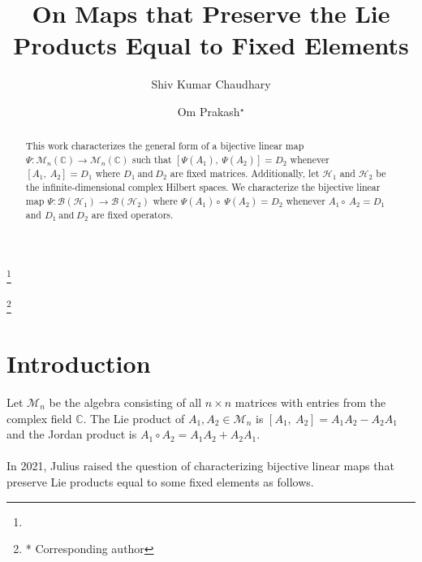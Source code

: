 \documentclass{amsart}
\theoremstyle{definition}
\theoremstyle{remark}
\numberwithin{equation}{section}
\begin{document}
	\title{On Maps that Preserve the Lie Products Equal to Fixed Elements}
	\author{Shiv Kumar Chaudhary} 
	\address{Department of Mathematics,	Indian Institute of Technology Patna, Patna-801106}
	\curraddr{}
	\thanks{}
	
	
	\author{Om Prakash$^{\star}$}
	\address{Department of Mathematics, Indian Institute of Technology Patna, Patna-801106}
	\curraddr{}
	\thanks{* Corresponding author}
	
	
	
	\date{}
	
	\dedicatory{}
	\maketitle
	\begin{abstract}
		   This work characterizes the general form of a bijective linear map $\Psi:\mathscr{M}_n(\mathbb{C}) \to \mathscr{M}_n(\mathbb{C})$ such that $[\Psi(A_1),~\Psi(A_2)]=D_2$ whenever $[A_1,~A_2]=D_1$ where $D_1~\text{and}~D_2$ are fixed matrices. Additionally, let $\mathscr{H}_1$ and $\mathscr{H}_2$ be the infinite-dimensional complex Hilbert spaces. We characterize the bijective linear map $\Psi: \mathscr{B}(\mathscr{H}_1) \to \mathscr{B}(\mathscr{H}_2)$ where $\Psi(A_1) \circ ~\Psi(A_2)=D_2$ whenever $A_1\circ ~A_2=D_1$ and $D_1~\text{and}~D_2$ are fixed operators.  \\
	\end{abstract}
	
	\keywords{}
	\section{Introduction}
	Let $\mathscr{M}_n$ be the algebra consisting of all $n\times n$ matrices with entries from the complex field $\mathbb{C}$. The Lie product of $A_1, A_2 \in \mathscr{M}_n$ is $[A_1,~A_2]=A_1A_2-A_2A_1$ and the Jordan product is $A_1 \circ A_2=A_1A_2+A_2A_1$.\\\\ In 2021, Julius \cite{jul} raised the question of characterizing bijective linear maps that preserve Lie products equal to some fixed elements as follows.\\
\end{document}
